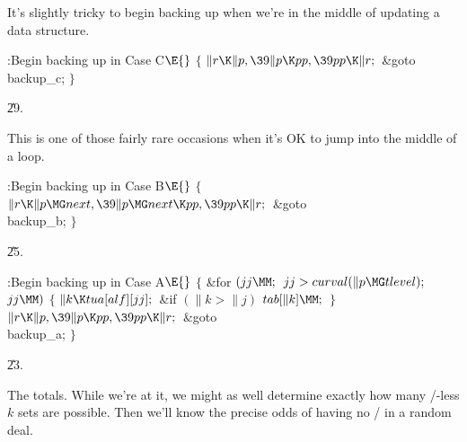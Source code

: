 It's slightly tricky to begin backing up when we're in the middle of
updating a data structure.

\Y\B\4:Begin backing up in Case C\X${}\E{}$\6
${}\{{}$\1\6
${}\|r\K\|p,\39\|p\K\\{pp},\39\\{pp}\K\|r;{}$\6
\&{goto} \\{backup\_c};\6
\4${}\}{}$\2\par
\U29.\fi

This is one of those fairly rare occasions when it's OK to
jump into the middle of a loop.

\Y\B\4:Begin backing up in Case B\X${}\E{}$\6
${}\{{}$\1\6
${}\|r\K\|p\MG\\{next},\39\|p\MG\\{next}\K\\{pp},\39\\{pp}\K\|r;{}$\6
\&{goto} \\{backup\_b};\6
\4${}\}{}$\2\par
\U25.\fi

\B{}:Begin backing up in Case A\X${}\E{}$\6
${}\{{}$\1\6
\&{for} ${}(\\{jj}\MM;{}$ ${}\\{jj}>\\{curval}(\|p\MG\\{tlevel});{}$ ${}\\{jj}%
\MM){}$\5
${}\{{}$\1\6
${}\|k\K\\{tua}[\\{alf}][\\{jj}];{}$\6
\&{if} ${}(\|k>\|j){}$\1\5
${}\\{tab}[\|k]\MM;{}$\2\6
\4${}\}{}$\2\6
${}\|r\K\|p,\39\|p\K\\{pp},\39\\{pp}\K\|r;{}$\6
\&{goto} \\{backup\_a};\6
\4${}\}{}$\2\par
\U23.\fi

The totals. While we're at it, we might as well determine exactly
how many \SET/-less $k$ sets are possible. Then we'll know the
precise odds of having no \SET/ in a random deal.


